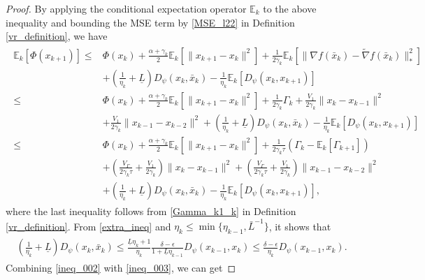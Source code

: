 \documentclass[letterpaper]{article} %
\begin{document}
\begin{proof}
		By applying the conditional expectation operator $\mathbb{E}_{k}$ to the above inequality and bounding the MSE term by \eqref{MSE_l22} in Definition \ref{vr_definition},   we have 
		\begin{eqnarray}
			\begin{aligned}
				\mathbb{E}_{k}[\Phi(x_{k+1})]\le& \Phi(x_{k}) +\frac{\alpha+\gamma_{k}}{2}\mathbb{E}_{k}[\|x_{k+1}-x_{k}\|^{2}]+\frac{1}{2\gamma_{k}}\mathbb{E}_{k}[\|\nabla f(\bar{x}_{k})-\tilde{\nabla} f(\bar{x}_{k})\|_{*}^{2}]\\
				&+\left(\frac{1}{\eta_{k}}+\underline{L}\right)D_{\psi}(x_{k},\bar{x}_{k}) -\frac{1}{\eta_{k}}\mathbb{E}_{k}[D_{\psi}(x_{k},x_{k+1})]\\
				\le&\Phi(x_{k}) +\frac{\alpha+\gamma_{k}}{2}\mathbb{E}_{k}[\|x_{k+1}-x_{k}\|^{2}]+\frac{1}{2\gamma_{k}}\Gamma_{k}+ \frac{V_{1}}{2\gamma_{k}}\|x_{k}-x_{k-1}\|^{2}\\
				&+\frac{V_{1}}{2\gamma_{k}} \|x_{k-1}-x_{k-2}\|^{2}+\left(\frac{1}{\eta_{k}}+\underline{L}\right)D_{\psi}(x_{k},\bar{x}_{k}) -\frac{1}{\eta_{k}}\mathbb{E}_{k}[D_{\psi}(x_{k},x_{k+1})]\\ 
				\le&\Phi(x_{k}) +\frac{\alpha+\gamma_{k}}{2}\mathbb{E}_{k}[\|x_{k+1}-x_{k}\|^{2}]+\frac{1}{2\gamma_{k}\tau}(\Gamma_{k}-\mathbb{E}_{k}[\Gamma_{k+1}])\\
				&+\left(\frac{V_{\Gamma}}{2\gamma_{k}\tau}+\frac{V_{1}}{2\gamma_{k}}\right)\|x_{k}-x_{k-1}\|^{2}+\left(\frac{V_{\Gamma}}{2\gamma_{k}\tau}+\frac{V_{1}}{2\gamma_{k}}\right)\|x_{k-1}-x_{k-2}\|^{2}\\
				&+\left(\frac{1}{\eta_{k}}+\underline{L}\right)D_{\psi}(x_{k},\bar{x}_{k}) -\frac{1}{\eta_{k}}\mathbb{E}_{k}[D_{\psi}(x_{k},x_{k+1})],
			\end{aligned}\label{ineq_002}
		\end{eqnarray}
		where the last inequality follows from \eqref{Gamma_k1_k} in Definition \ref{vr_definition}.  From \eqref{extra_ineq} and $\eta_{k}\le\min\{\eta_{k-1},\bar{L}^{-1}\}$, it shows that
		\begin{eqnarray}
			\begin{aligned}
				\left(\frac{1}{\eta_{k}}+\underline{L}\right)D_{\psi}(x_{k},\bar{x}_{k})
				\le \frac{\underline{L}\eta_{k}+1}{\eta_{k}}\frac{\delta-\epsilon}{1+\underline{L}\eta_{k-1}}D_{\psi}(x_{k-1},x_{k})\le\frac{\delta-\epsilon}{\eta_{k}}D_{\psi}(x_{k-1},x_{k}).  \label{ineq_003}
			\end{aligned}
		\end{eqnarray}
		Combining \eqref{ineq_002} with \eqref{ineq_003}, we can get 

\end{proof}
\end{document}
